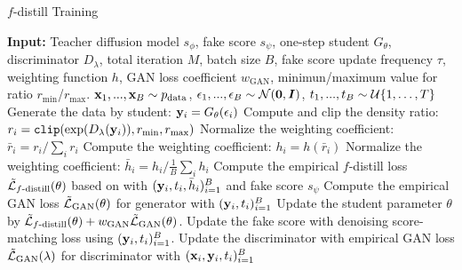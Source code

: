 \begin{algorithm}[t]
\small
    \caption{$f$-distill Training}
    \label{alg:f-distill}
    \begin{algorithmic}[1]
        \State \textbf{Input:} Teacher diffusion model $s_\phi$, fake score $s_\psi$, one-step student $G_\theta$, discriminator $D_\lambda$, total iteration $M$, batch size $B$, fake score update frequency $\tau$, weighting function $h$, GAN loss coefficient $w_{\textrm{GAN}}$, minimun/maximum value for ratio $r_{\textrm{min}}$/$r_{\textrm{max}}$.
                    \State ${\mathbf{x}}_1,...,{\mathbf{x}}_B \sim p_{\text{data}}$, $\epsilon_1,...,\epsilon_B \sim \mathcal{N}(  \mathbf{0}, {\bm{I}})$,
            $t_{1},...,t_B \sim {\mathcal{U}}\{1, \dots, T\}$
            \State Generate the data by student: ${\mathbf{y}}_i = G_\theta(\epsilon_i)$
          
            \State Compute and clip the density ratio: $r_i = \texttt{clip}(\exp(D_\lambda({\mathbf{y}}_i)),r_{\textrm{min}},r_{\textrm{max}}) $
               \State Normalize the weighting coefficient: $\bar{r}_i = r_i / \sum_i r_i$ 
            \State Compute the weighting coefficient: $h_i = h(\bar{r}_i)$
            \State Normalize the weighting coefficient: $\bar{h}_i = h_i / \frac{1}{B}\sum_i h_i$ 
            \State Compute the empirical $f$-distill loss $\tilde{{\mathcal{L}}}_{\textrm{$f$-distill}}(\theta)$ based on  with $({\mathbf{y}}_i, t_i, \bar{h}_i)_{i=1}^B$ and fake score $s_\psi$
            \State Compute the empirical GAN loss $\tilde{{\mathcal{L}}}_{\textrm{GAN}}(\theta)$ for generator with $({\mathbf{y}}_i, t_i)_{i=1}^B$ 
            \State Update the student parameter $\theta$ by $\tilde{{\mathcal{L}}}_{\textrm{$f$-distill}}(\theta)+w_{\textrm{GAN}}\tilde{{\mathcal{L}}}_{\textrm{GAN}}(\theta)$.
        \Else {}
            \State Update the fake score with denoising score-matching loss using $({\mathbf{y}}_i, t_i)_{i=1}^B$.
            \State Update the discriminator with empirical GAN loss $\tilde{{\mathcal{L}}}_{\textrm{GAN}}(\lambda)$ for discriminator with $({\mathbf{x}}_i, {\mathbf{y}}_i, t_i)_{i=1}^B$ 
        \EndIf
        
        \EndFor
    \end{algorithmic}
    \end{algorithm}
